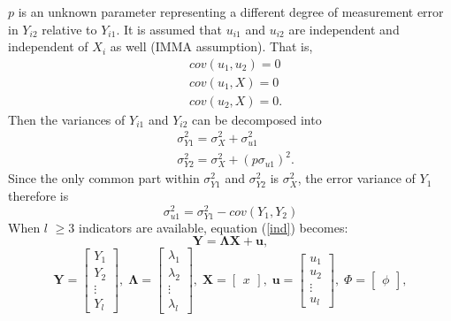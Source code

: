 \documentclass[oneside,a4paper]{article}
\begin{document}
$p$ is an unknown parameter representing a different degree of measurement error in $Y_{i2}$ relative to $Y_{i1}$. It is assumed that $u_{i1}$ and $u_{i2}$ are independent and independent of $X_{i}$ as well (IMMA assumption). That is, 
\begin{equation}
\begin{split}
&cov(u_{1}, u_{2}) = 0 \\&cov(u_{1}, X) = 0\\&cov(u_{2}, X) = 0.
\end{split}
\end{equation}
Then the variances of $Y_{i1}$ and $Y_{i2}$ can be decomposed into 
\begin{equation}
\begin{split}
&\sigma_{Y1}^2 = \sigma_{X}^2 + \sigma_{u1}^2 \\
&\sigma_{Y2}^2 = \sigma_{X}^2 + (p\sigma_{u1})^2.
\end{split}
\end{equation}
Since the only common part within $\sigma_{Y1}^2$ and $\sigma_{Y2}^2$ is $\sigma_{X}^2$, the error variance of $Y_1$ therefore is
\begin{equation}
\sigma_{u1}^2 = \sigma_{Y1}^2 - cov(Y_{1},Y_{2})
\end{equation}
When $l$ $\geq3$ indicators are available, equation (\ref{ind}) becomes:
\begin{equation}
\textbf{Y}= \mathbf{ \Lambda }\textbf{X} + \textbf{u}, 
\end{equation}
\begin{equation*}
\textbf{Y} = 
\begin{bmatrix}
Y_1\\Y_2\\ \vdots \\Y_l
\end{bmatrix},\;
\mathbf{\Lambda}= 
\begin{bmatrix}
\lambda_1\\\lambda_2\\ \vdots \\\lambda_l
\end{bmatrix},\;
\textbf{X} = 
\begin{bmatrix}
x
\end{bmatrix},\;
\textbf{u} = 
\begin{bmatrix}
u_1\\u_2\\ \vdots \\u_l
\end{bmatrix},\;
\Phi= 
\begin{bmatrix}
\phi
\end{bmatrix},
\end{equation*}
\end{document}
